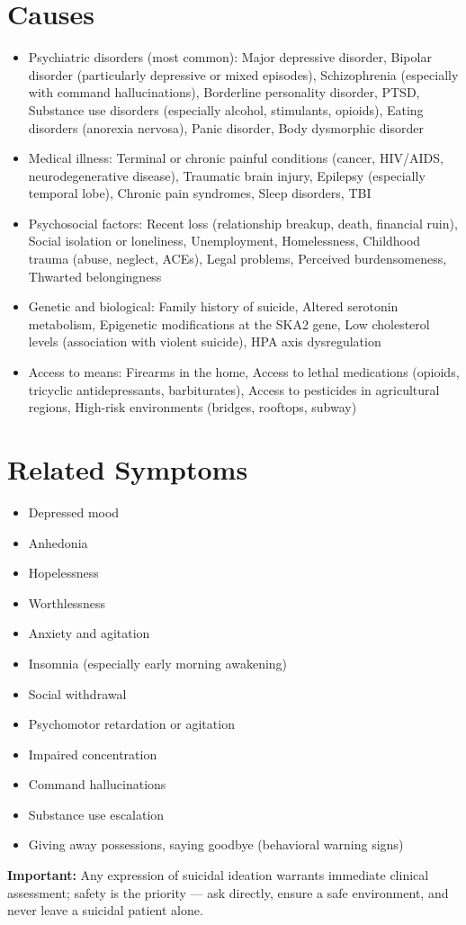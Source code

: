 \section*{Causes}
\begin{itemize}
  \item Psychiatric disorders (most common): Major depressive disorder, Bipolar disorder (particularly depressive or mixed episodes), Schizophrenia (especially with command hallucinations), Borderline personality disorder, PTSD, Substance use disorders (especially alcohol, stimulants, opioids), Eating disorders (anorexia nervosa), Panic disorder, Body dysmorphic disorder
  \item Medical illness: Terminal or chronic painful conditions (cancer, HIV/AIDS, neurodegenerative disease), Traumatic brain injury, Epilepsy (especially temporal lobe), Chronic pain syndromes, Sleep disorders, TBI
  \item Psychosocial factors: Recent loss (relationship breakup, death, financial ruin), Social isolation or loneliness, Unemployment, Homelessness, Childhood trauma (abuse, neglect, ACEs), Legal problems, Perceived burdensomeness, Thwarted belongingness
  \item Genetic and biological: Family history of suicide, Altered serotonin metabolism, Epigenetic modifications at the SKA2 gene, Low cholesterol levels (association with violent suicide), HPA axis dysregulation
  \item Access to means: Firearms in the home, Access to lethal medications (opioids, tricyclic antidepressants, barbiturates), Access to pesticides in agricultural regions, High-risk environments (bridges, rooftops, subway)
\end{itemize}

\section*{Related Symptoms}
\begin{itemize}
  \item Depressed mood
  \item Anhedonia
  \item Hopelessness
  \item Worthlessness
  \item Anxiety and agitation
  \item Insomnia (especially early morning awakening)
  \item Social withdrawal
  \item Psychomotor retardation or agitation
  \item Impaired concentration
  \item Command hallucinations
  \item Substance use escalation
  \item Giving away possessions, saying goodbye (behavioral warning signs)
\end{itemize}
\textbf{Important:} Any expression of suicidal ideation warrants immediate clinical assessment; safety is the priority --- ask directly, ensure a safe environment, and never leave a suicidal patient alone.

